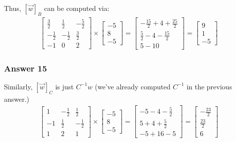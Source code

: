 \documentclass[11pt]{article}
\begin{document}
Thus, $[\vec{w}]_B$ can be computed via:
\begin{align*}
  \begin{bmatrix}
    \frac{3}{2}  & \frac{1}{2}  & -\frac{5}{2} \\
    -\frac{1}{2} & -\frac{1}{2} & \frac{3}{2} \\
    -1           & 0            & 2
  \end{bmatrix} \times 
  \begin{bmatrix}
    -5 \\
    8 \\
    -5
  \end{bmatrix} =
  \begin{bmatrix}
    -\frac{15}{2} + 4 + \frac{25}{2} \\
    \frac{5}{2} - 4 - \frac{15}{2} \\
    5 - 10
  \end{bmatrix} = 
  \begin{bmatrix}
    9 \\
    1 \\
    -5
  \end{bmatrix}
\end{align*}

\subsubsection{Answer 15}
\label{sec-1-6-3}
Similarly, $[\vec{w}]_C$ is just $C^{-1}w$ (we've already computed $C^{-1}$
in the previous answer.)
\begin{align*}
  \begin{bmatrix}
    1  & -\frac{1}{2} & \frac{1}{2} \\
    -1 & \frac{1}{2}  & -\frac{1}{2} \\
    1  & 2            & 1
  \end{bmatrix} \times
  \begin{bmatrix}
    -5 \\
    8 \\
    -5
  \end{bmatrix} =
  \begin{bmatrix}
    -5 - 4 - \frac{5}{2} \\
    5  + 4 + \frac{5}{2} \\
    -5 + 16 - 5
  \end{bmatrix} =
  \begin{bmatrix}
    -\frac{23}{2} \\
    \frac{23}{2} \\
    6
  \end{bmatrix}
\end{align*}
\end{document}
